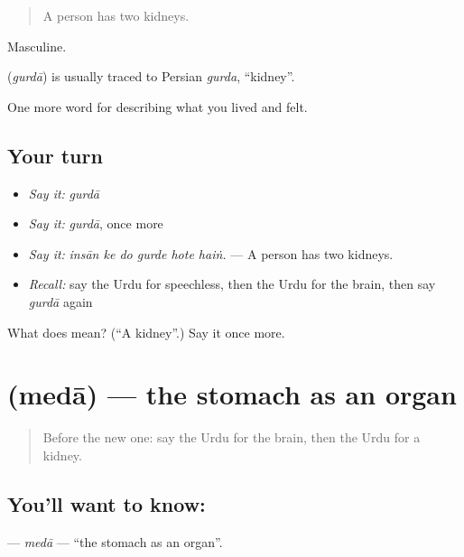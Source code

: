 \begin{quote}
A person has two kidneys.
\end{quote}

Masculine.

\begin{cousinweb}
\textbf{} (\emph{gurdā}) is usually traced to Persian \emph{gurda}, \textquotedblleft{}kidney\textquotedblright{}.
\end{cousinweb}

\begin{grammarlens}[title={What you've built}]
One more word for describing what you lived and felt.
\end{grammarlens}

\subsection*{Your turn}
\begin{itemize}
\raggedright
  \item \emph{Say it:} \emph{gurdā}
  \item \emph{Say it:} \emph{gurdā}, once more
  \item \emph{Say it:} \emph{insān ke do gurde hote haiṅ.} — A person has two kidneys.
  \item \emph{Recall:} say the Urdu for speechless, then the Urdu for the brain, then say \emph{gurdā} again
\end{itemize}

\begin{tcolorbox}[breakable,colback=teal!4,colframe=teal!35!black,title={Before you move on}]
What does  mean? (\textquotedblleft{}A kidney\textquotedblright{}.) Say it once more.
\end{tcolorbox}
\section[\texorpdfstring{\ur{معدہ} (medā)}{معدہ (medā)}]{ (medā) — the stomach as an organ}

\label{lesson:UR-C464-meda}



\begin{quote}
Before the new one: say the Urdu for the brain, then the Urdu for a kidney.
\end{quote}

\subsection*{You'll want to know: }
\textbf{} — \emph{medā} — \textquotedblleft{}the stomach as an organ\textquotedblright{}.

